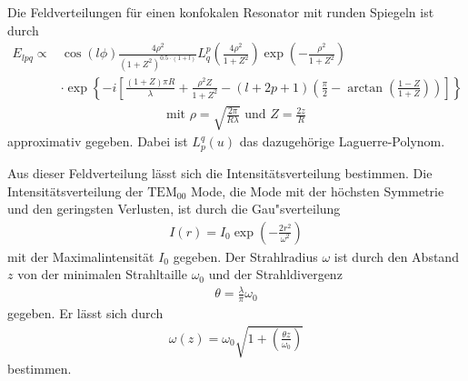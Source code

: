 \documentclass[captions=tableheading]{scrartcl}
\begin{document}
Die Feldverteilungen für einen konfokalen Resonator mit runden Spiegeln ist durch
\begin{align*}
 E_{lpq} \propto &\cos \left(l \phi \right) \frac{4\rho^ 2}{\left(1+Z^2 \right)^{0.5\cdot \left(1+l\right)}}L_{q}^{p}\left( \frac{4\rho^2}{1+Z^2} \right)\exp \left(-\frac{\rho^2}{1+Z^2}\right) \\
&\cdot\exp \left\{-i \left[ \frac{\left(1+Z \right)\pi R}{\lambda} + \frac{\rho^2Z}{1+Z^2} - \left(l+2p+1\right)\left(\frac{\pi}{2}-\arctan \left(\frac{1-Z}{1+Z}\right) \right) \right] \right\}
\end{align*}
\begin{align*}
\text{mit } \rho= \sqrt{\frac{2\pi}{R\lambda}} \text{ und } Z=\frac{2z}{R}
\end{align*}
approximativ gegeben. Dabei ist $L^{q}_{p}\left(u\right) $ das dazugehörige Laguerre-Polynom.

Aus dieser Feldverteilung lässt sich die Intensitätsverteilung bestimmen. Die Intensitätsverteilung der $\text{TEM}_{00}$ Mode, die Mode mit der höchsten Symmetrie und den geringsten Verlusten, ist durch die Gau"sverteilung
\begin{align}
 I\left(r\right)=I_0\exp \left(-\frac{2r^2}{\omega^2}\right)
 \label{eq:tem00}
\end{align}
mit der Maximalintensität $I_0$ gegeben. Der Strahlradius $\omega$ ist durch den Abstand $z$ von der minimalen Strahltaille $\omega_0$ und der Strahldivergenz 
\begin{align}
 \theta = \frac{\lambda}{\pi}\omega_0
\end{align}
gegeben. Er lässt sich durch
\begin{align}
 \omega\left(z\right)=\omega_0\sqrt{1+\left(\frac{\theta z}{\omega_0}\right)}
\end{align}
bestimmen. 
\end{document}
